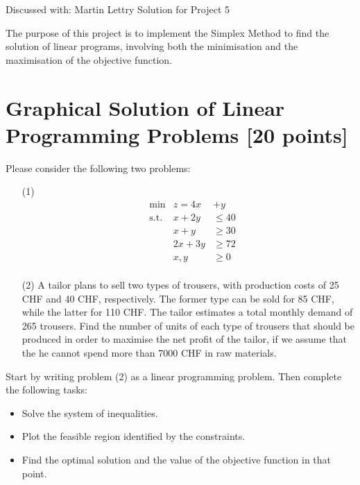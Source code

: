 \documentclass[unicode,11pt,a4paper,oneside,numbers=endperiod,openany]{scrartcl}
\begin{document}
\setassignment
{}

{Discussed with: Martin Lettry}
{Solution for Project 5}{}
\newline

\assignmentpolicy


The purpose of this project is to implement the Simplex Method to find the solution of linear programs, involving both the minimisation and the maximisation of the objective function.

\section{Graphical Solution of Linear Programming Problems [20 points]}
Please consider the following two problems:
\begin{enumerate}
	\item[(1)] \begin{equation*}
			\begin{aligned}
				 & \text{min}  & z = 4x  & + y     \\
				 & \text{s.t.} & x + 2y  & \leq 40 \\
				 &             & x + y   & \geq 30 \\
				 &             & 2x + 3y & \geq 72 \\
				 &             & x, y    & \geq 0  \\
			\end{aligned}
		\end{equation*}
	\item[(2)] A tailor plans to sell two types of trousers, with production costs of 25 CHF and 40 CHF, respectively. The former type can be sold for 85 CHF, while the latter for 110 CHF. The tailor estimates a total monthly demand of 265 trousers. Find the number of units of each type of trousers that should be produced in order to maximise the net profit of the tailor, if we assume that the he cannot spend more than 7000 CHF in raw materials.
\end{enumerate}
Start by writing problem (2) as a linear programming problem. Then complete the following tasks:
\begin{itemize}
	\item Solve the system of inequalities.
	\item Plot the feasible region identified by the constraints.
	\item Find the optimal solution and the value of the objective function in that point.
\end{itemize}
\end{document}
